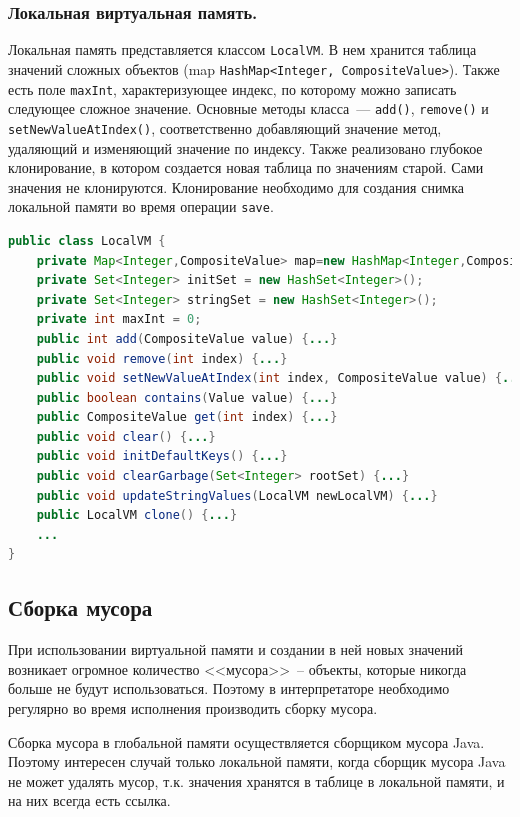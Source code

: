 \subsubsection*{Локальная виртуальная память.}
Локальная память представляется классом \texttt{LocalVM}. В нем хранится таблица значений сложных объектов (map \texttt{HashMap<Integer, CompositeValue>}). Также есть поле \texttt{maxInt}, характеризующее индекс, по которому можно записать следующее сложное значение. Основные методы класса~--- \texttt{add()}, \texttt{remove()} и \texttt{setNewValueAtIndex()}, соответственно добавляющий значение метод, удаляющий и изменяющий значение по индексу. Также реализовано глубокое клонирование, в котором создается новая таблица по значениям старой. Сами значения не клонируются. Клонирование необходимо для создания снимка локальной памяти во время операции \texttt{save}. 

\begin{lstlisting}[label=LocalVM,caption=Интерфейс класса LocalVM, frame = none, language = Java]
public class LocalVM {
    private Map<Integer,CompositeValue> map=new HashMap<Integer,CompositeValue>();
    private Set<Integer> initSet = new HashSet<Integer>();
    private Set<Integer> stringSet = new HashSet<Integer>();
    private int maxInt = 0;
    public int add(CompositeValue value) {...}
    public void remove(int index) {...}
    public void setNewValueAtIndex(int index, CompositeValue value) {...}
    public boolean contains(Value value) {...}
    public CompositeValue get(int index) {...}
    public void clear() {...}
    public void initDefaultKeys() {...}
    public void clearGarbage(Set<Integer> rootSet) {...}
    public void updateStringValues(LocalVM newLocalVM) {...}
    public LocalVM clone() {...}
    ...
}
\end{lstlisting}

\subsection{Сборка мусора}
При использовании виртуальной памяти и создании в ней новых значений возникает огромное количество <<мусора>>~-- объекты, которые никогда больше не будут использоваться. Поэтому в интерпретаторе необходимо регулярно во время исполнения производить сборку мусора.

Сборка мусора в глобальной памяти осуществляется сборщиком мусора Java. Поэтому интересен случай только локальной памяти, когда сборщик мусора Java не может удалять мусор, т.к. значения хранятся в таблице в локальной памяти, и на них всегда есть ссылка.

